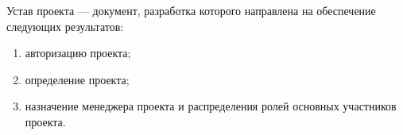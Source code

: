 Устав проекта --- документ, разработка которого направлена на обеспечение следующих результатов:
\begin{enumerate}[noitemsep]
	\item авторизацию проекта;
\item определение проекта;
\item назначение менеджера проекта и распределения ролей основных участников проекта.
\end{enumerate}








